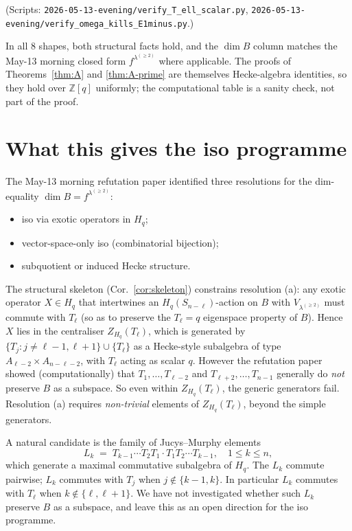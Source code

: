 \documentclass[11pt]{article}
\theoremstyle{definition}
\newcommand{\Hq}{H_q}
\begin{document}
\noindent (Scripts:
\texttt{2026-05-13-evening/verify\_T\_ell\_scalar.py},
\texttt{2026-05-13-evening/verify\_omega\_kills\_E1minus.py}.)

In all $8$ shapes, both structural facts hold, and the $\dim B$
column matches the May-13 morning closed form $f^{\lambda^{(\ge 2)}}$
where applicable. The proofs of Theorems~\ref{thm:A} and
\ref{thm:A-prime} are themselves Hecke-algebra identities, so they
hold over $\mathbb{Z}[q]$ uniformly; the computational table is a
sanity check, not part of the proof.

\section{What this gives the iso programme}\label{sec:iso-prog}

The May-13 morning refutation paper identified three resolutions for the
dim-equality $\dim B = f^{\lambda^{(\ge 2)}}$:
\begin{itemize}[topsep=0.2em,itemsep=0.1em]
\item[(a)] iso via exotic operators in $\Hq$;
\item[(b)] vector-space-only iso (combinatorial bijection);
\item[(c)] subquotient or induced Hecke structure.
\end{itemize}

The structural skeleton (Cor.~\ref{cor:skeleton}) constrains resolution
(a): any exotic operator $X \in \Hq$ that intertwines an
$H_q(S_{n-\ell})$-action on $B$ with $V_{\lambda^{(\ge 2)}}$ must
commute with $T_\ell$ (so as to preserve the $T_\ell = q$ eigenspace
property of $B$). Hence $X$ lies in the centraliser
$Z_{\Hq}(T_\ell)$, which is generated by $\{T_j : j \ne \ell-1, \ell+1\}
\cup \{T_\ell\}$ as a Hecke-style subalgebra of type
$A_{\ell-2} \times A_{n-\ell-2}$, with $T_\ell$ acting as scalar $q$.
However the refutation paper showed (computationally) that
$T_1, \ldots, T_{\ell-2}$ and $T_{\ell+2}, \ldots, T_{n-1}$ generally do
\emph{not} preserve $B$ as a subspace. So even within $Z_{\Hq}(T_\ell)$,
the generic generators fail. Resolution (a) requires \emph{non-trivial}
elements of $Z_{\Hq}(T_\ell)$, beyond the simple generators.

A natural candidate is the family of Jucys--Murphy elements
\[
   L_k \;=\; T_{k-1} \cdots T_2 T_1 \cdot T_1 T_2 \cdots T_{k-1}, \quad 1 \le k \le n,
\]
which generate a maximal commutative subalgebra of $\Hq$. The $L_k$
commute pairwise; $L_k$ commutes with $T_j$ when $j \notin \{k-1, k\}$.
In particular $L_k$ commutes with $T_\ell$ when $k \notin
\{\ell, \ell+1\}$. We have not investigated whether such $L_k$
preserve $B$ as a subspace, and leave this as an open direction for
the iso programme.
\end{document}
